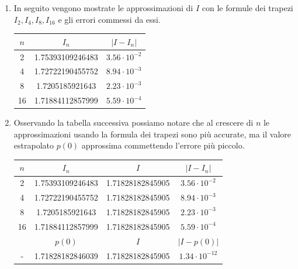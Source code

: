 \documentclass[a4paper,12pt]{article}
\begin{document}
\begin{enumerate}[label=(\alph*)]
\item In seguito vengono mostrate le approssimazioni di $I$ con le formule dei trapezi $I_2,I_4,I_8,I_{16}$ e gli errori commessi da essi.  
\begin{table}[h!]
  \begin{center}
    \begin{tabular}{c|c|c}
      $n$ & $I_n$ & $|I-I_n|$ \\
      \hline
       2 &   1.75393109246483    & $3.56\cdot10^{-2}$\\
     4  &  1.72722190455752  & $8.94\cdot10^{-3}$\\
     8  &  1.7205185921643  & $2.23\cdot10^{-3}$\\
    16  & 1.71884112857999 & $5.59\cdot10^{-4}$\\
    \end{tabular}
  \end{center}
\end{table}

\item Osservando la tabella successiva possiamo notare che al crescere di $n$ le approssimazioni usando la formula dei trapezi sono più accurate, ma il valore estrapolato $p(0)$ approssima commettendo l'errore più piccolo.

\begin{table}[H]
  \begin{center}
    \begin{tabular}{c|c|c|c}
      $n$ & $I_n$ & $I$ & $|I-I_n|$ \\
      \hline
       2 & 1.75393109246483  &  1.71828182845905     & $3.56\cdot10^{-2}$\\
    4 & 1.72722190455752 &   1.71828182845905  &   $8.94\cdot10^{-3}$\\
     8 & 1.7205185921643 &   1.71828182845905   &  $2.23\cdot10^{-3}$\\
    16 & 1.71884112857999  &  1.71828182845905  &  $5.59\cdot10^{-4}$\\
     & $p(0)$ & $I$ & $|I-p(0)|$\\
    \hline
      - & 1.71828182846039  &  1.71828182845905 &    $1.34\cdot10^{-12}$\\
    \end{tabular}
  \end{center}
\end{table}

\end{enumerate}
\end{document}
